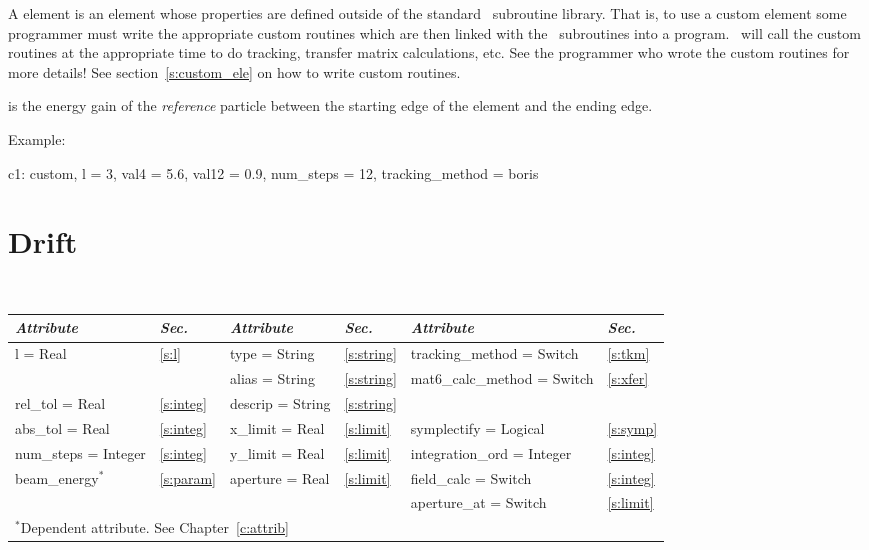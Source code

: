 A  element is an element whose properties are defined
outside of the standard \bmad\ subroutine library. That is, to use a
custom element some programmer must write the appropriate custom
routines which are then linked with the \bmad\ subroutines into a
program. \bmad\ will call the custom routines at the appropriate time
to do tracking, transfer matrix calculations, etc. See the programmer
who wrote the custom routines for more details! See 
section~\ref{s:custom_ele} on how to write custom routines.

 is the energy gain of the {\it reference} particle
between the starting edge of the element and the ending edge.

Example:
\begin{example}
  c1: custom, l = 3, val4 = 5.6, val12 = 0.9, num_steps = 12, tracking_method = boris
\end{example}

\section{Drift}
\label{s:drift}

\begin{center}
\tt
\begin{tabular}{|l|l||l|l||l|l|} \hline
  {\sl Attribute} & {\sl Sec.}  & {\sl Attribute} & {\sl Sec.} & {\sl Attribute} & {\sl Sec.} \\ \hline
  l        = Real       & \ref{s:l}     & type = String    & \ref{s:string} & tracking\_method = Switch    & \ref{s:tkm}   \\ \hline
                        &               & alias = String   & \ref{s:string} & mat6\_calc\_method = Switch  & \ref{s:xfer}  \\ \hline
  rel\_tol = Real       & \ref{s:integ} & descrip = String & \ref{s:string} &                              &               \\ \hline
  abs\_tol = Real       & \ref{s:integ} & x\_limit = Real  & \ref{s:limit}  & symplectify = Logical        & \ref{s:symp}  \\ \hline
  num\_steps = Integer  & \ref{s:integ} & y\_limit = Real  & \ref{s:limit}  & integration\_ord = Integer   & \ref{s:integ} \\ \hline
  beam\_energy$^*$      & \ref{s:param} & aperture = Real  & \ref{s:limit}  & field\_calc = Switch         & \ref{s:integ} \\ \hline
                        &               &                  &                & aperture\_at = Switch        & \ref{s:limit} \\ \hline
  \multicolumn{6}{l}{\small $^*$Dependent attribute. See Chapter~\ref{c:attrib}} \\
\end{tabular}
\end{center}
\toffset

